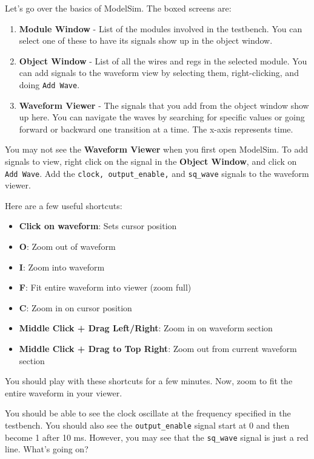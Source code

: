 \documentclass[11pt]{article}
\begin{document}
Let's go over the basics of ModelSim. The boxed screens are:

\begin{enumerate}
	\item \textbf{Module Window} - List of the modules involved in the testbench. You can select one of these to have its signals show up in the object window.
	\item \textbf{Object Window} - List of all the wires and regs in the selected module. You can add signals to the waveform view by selecting them, right-clicking, and doing \verb|Add Wave|.
	\item \textbf{Waveform Viewer} - The signals that you add from the object window show up here. You can navigate the waves by searching for specific values or going forward or backward one transition at a time. The x-axis represents time.
\end{enumerate}

You may not see the \textbf{Waveform Viewer} when you first open ModelSim. To add signals to view, right click on the signal in the \textbf{Object Window}, and click on \verb|Add Wave|. Add the \verb|clock, output_enable,| and \verb|sq_wave| signals to the waveform viewer.

Here are a few useful shortcuts:

\begin{itemize}
	\item \textbf{Click on waveform}: Sets cursor position
	\item \textbf{O}: Zoom out of waveform
	\item \textbf{I}: Zoom into waveform
	\item \textbf{F}: Fit entire waveform into viewer (zoom full)
	\item \textbf{C}: Zoom in on cursor position
	\item \textbf{Middle Click + Drag Left/Right}: Zoom in on waveform section
	\item \textbf{Middle Click + Drag to Top Right}: Zoom out from current waveform section
\end{itemize}

You should play with these shortcuts for a few minutes. Now, zoom to fit the entire waveform in your viewer.

You should be able to see the clock oscillate at the frequency specified in the testbench. You should also see the \verb|output_enable| signal start at 0 and then become 1 after 10 ms. However, you may see that the \verb|sq_wave| signal is just a red line. What's going on?
\end{document}
